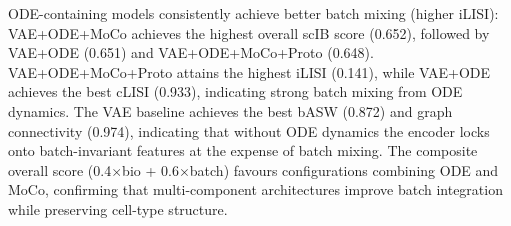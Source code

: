 \documentclass[journal]{IEEEtran}
\begin{document}
\begin{table}[!t]
    \centering
    \caption{Batch integration metrics (IRALL, 3{,}000 cells, $\beta{=}0.1$, scIB suite). Higher is better for all metrics. Best values in \textbf{bold}.}
    \label{tab:batch_integration}
\end{table}

ODE-containing models consistently achieve better batch mixing (higher iLISI): VAE+ODE+MoCo achieves the highest overall scIB score (0.652), followed by VAE+ODE (0.651) and VAE+ODE+MoCo+Proto (0.648). VAE+ODE+MoCo+Proto attains the highest iLISI (0.141), while VAE+ODE achieves the best cLISI (0.933), indicating strong batch mixing from ODE dynamics. The VAE baseline achieves the best bASW (0.872) and graph connectivity (0.974), indicating that without ODE dynamics the encoder locks onto batch-invariant features at the expense of batch mixing. The composite overall score (0.4$\times$bio + 0.6$\times$batch) favours configurations combining ODE and MoCo, confirming that multi-component architectures improve batch integration while preserving cell-type structure.


\end{document}
